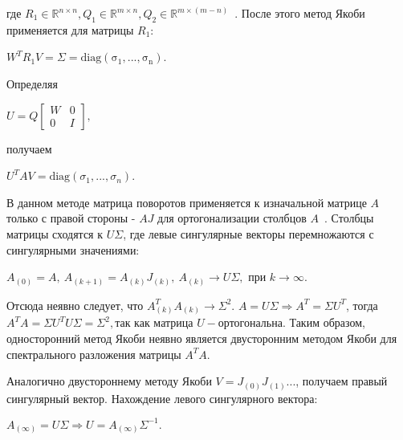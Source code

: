 где $R_1 \in \mathbb{R}^{n\times n}, Q_1 \in \mathbb{R}^{m\times n}, Q_2\in \mathbb{R}^{m\times (m-n)}$~\cite{Golub2013}. После этого метод Якоби применяется для матрицы $R_1$:
\begin{center}
    $W^TR_1V=\Sigma = \mathrm{diag(\sigma_1,...,\sigma_n)}$.
\end{center}
Определяя 
\begin{center}
    $U = Q\begin{bmatrix}
        W&0\\0&I
    \end{bmatrix},$    
\end{center}
получаем
\begin{center}
     $U^TAV = \mathrm{diag}(\sigma_1,...,\sigma_n)$.
\end{center}



В данном методе матрица поворотов применяется к изначальной матрице $A$ только с правой стороны - $AJ$ для ортогонализации столбцов $A$~\cite{Hestenes1958}.
Столбцы матрицы сходятся к $U\Sigma$, где левые сингулярные векторы перемножаются с сингулярными значениями:
\begin{center}
     $A_{(0)}=A,\ A_{(k+1)} = A_{(k)}J_{(k)},\ A_{(k)} \longrightarrow U\Sigma, \text{ при } k\to\infty$.
 \end{center}
 \begin{note}
     Отсюда неявно следует, что $A^T_{(k)}A_{(k)} \to \Sigma^2$. $A = U\Sigma \Rightarrow A^T = \Sigma U^T$, тогда $ A^TA = \Sigma U^TU\Sigma = \Sigma^2, \text{так как матрица } U -\text{ортогональна}.$ Таким образом, односторонний метод Якоби неявно является двусторонним методом Якоби для спектрального разложения матрицы $A^TA$.
 \end{note}
 Аналогично двустороннему методу Якоби $V = J_{(0)}J_{(1)}...$, получаем правый сингулярный вектор. Нахождение левого сингулярного вектора:
 \begin{center}
     $A_{(\infty)} = U\Sigma \Rightarrow U = A_{(\infty)}\Sigma^{-1}.$
 \end{center}


